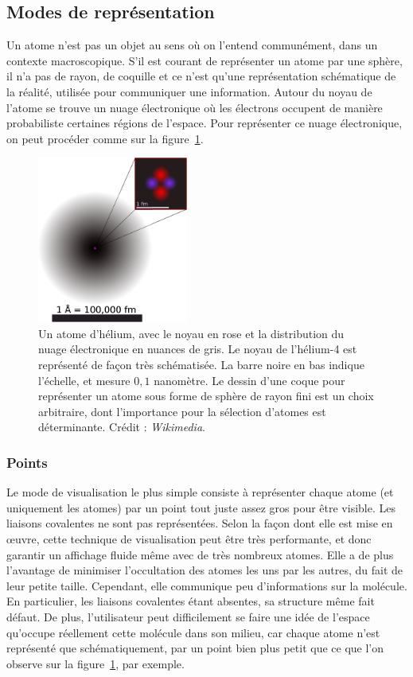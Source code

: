 	
	\FloatBarrier \subsection{Modes de représentation}
	Un atome n'est pas un objet au sens où on l'entend communément, dans un contexte macroscopique. S'il est courant de représenter un atome par une sphère, il n'a pas de rayon, de \og coquille \fg{} et ce n'est qu'une représentation schématique de la réalité, utilisée pour communiquer une information. Autour du noyau de l'atome se trouve un nuage électronique où les électrons occupent de manière probabiliste certaines régions de l'espace. Pour représenter ce nuage électronique, on peut procéder comme sur la figure~\ref{fig:helium}.

	
	\begin{figure}
		\centering
		\includegraphics[width=0.44\textwidth]{figures/ch1/helium}
		\caption[Un atome d'hélium avec son nuage électronique]{Un atome d'hélium, avec le noyau en rose et la distribution du nuage électronique en nuances de gris. Le noyau de l'hélium-4 est représenté de façon très schématisée. La barre noire en bas indique l'échelle, et mesure $0,1$ nanomètre. Le dessin d'une \og coque \fg{}  pour représenter un atome sous forme de sphère de rayon fini est un choix arbitraire, dont l'importance pour la sélection d'atomes est déterminante. Crédit : \emph{Wikimedia}.}
		\label{fig:helium}
	\end{figure}
	
	\subsubsection{Points} Le mode de visualisation le plus simple consiste à représenter chaque atome (et uniquement les atomes) par un point tout juste assez gros pour être visible. Les liaisons covalentes ne sont pas représentées. Selon la façon dont elle est mise en œuvre, cette technique de visualisation peut être très performante, et donc garantir un affichage fluide même avec de très nombreux atomes. Elle a de plus l'avantage de minimiser l'occultation des atomes les uns par les autres, du fait de leur petite taille. Cependant, elle communique peu d'informations sur la molécule. En particulier, les liaisons covalentes étant absentes, sa structure même fait défaut. De plus, l'utilisateur peut difficilement se faire une idée de l'espace qu'occupe réellement cette molécule dans son milieu, car chaque atome n'est représenté que schématiquement, par un point bien plus petit que ce que l'on observe sur la figure~\ref{fig:helium}, par exemple.
		
